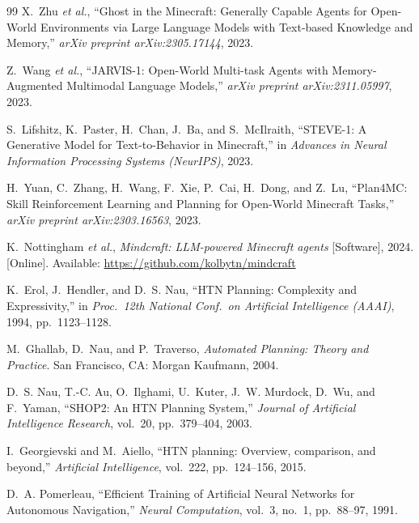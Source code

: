 \begin{thebibliography}{99}
X.~Zhu \emph{et al.},
``Ghost in the Minecraft: Generally Capable Agents for Open-World Environments
via Large Language Models with Text-based Knowledge and Memory,''
\emph{arXiv preprint arXiv:2305.17144}, 2023.

Z.~Wang \emph{et al.},
``JARVIS-1: Open-World Multi-task Agents with Memory-Augmented Multimodal
Language Models,''
\emph{arXiv preprint arXiv:2311.05997}, 2023.

S.~Lifshitz, K.~Paster, H.~Chan, J.~Ba, and S.~McIlraith,
``STEVE-1: A Generative Model for Text-to-Behavior in Minecraft,''
in \emph{Advances in Neural Information Processing Systems (NeurIPS)},
2023.

H.~Yuan, C.~Zhang, H.~Wang, F.~Xie, P.~Cai, H.~Dong, and Z.~Lu,
``Plan4MC: Skill Reinforcement Learning and Planning for Open-World Minecraft
Tasks,''
\emph{arXiv preprint arXiv:2303.16563}, 2023.

K.~Nottingham \emph{et al.},
\emph{Mindcraft: LLM-powered Minecraft agents} [Software], 2024.
[Online]. Available: \url{https://github.com/kolbytn/mindcraft}


K.~Erol, J.~Hendler, and D.~S. Nau,
``HTN Planning: Complexity and Expressivity,''
in \emph{Proc.\ 12th National Conf.\ on Artificial Intelligence (AAAI)},
1994, pp.~1123--1128.

M.~Ghallab, D.~Nau, and P.~Traverso,
\emph{Automated Planning: Theory and Practice}.
San Francisco, CA: Morgan Kaufmann, 2004.

D.~S. Nau, T.-C. Au, O.~Ilghami, U.~Kuter, J.~W. Murdock, D.~Wu, and F.~Yaman,
``SHOP2: An HTN Planning System,''
\emph{Journal of Artificial Intelligence Research}, vol.~20, pp.~379--404,
2003.

I.~Georgievski and M.~Aiello,
``HTN planning: Overview, comparison, and beyond,''
\emph{Artificial Intelligence}, vol.~222, pp.~124--156, 2015.


D.~A. Pomerleau,
``Efficient Training of Artificial Neural Networks for Autonomous
Navigation,''
\emph{Neural Computation}, vol.~3, no.~1, pp.~88--97, 1991.


\end{thebibliography}
